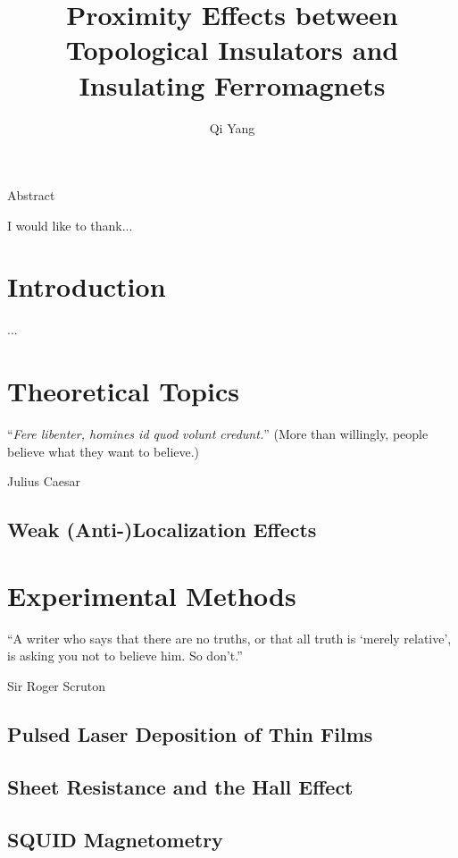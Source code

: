 ﻿\documentclass{report}
\begin{document}
\title{Proximity Effects between Topological Insulators and Insulating Ferromagnets}
\author{Qi Yang}

\beforepreface


    Abstract 


    I would like to thank...
\afterpreface

\captionsetup{width=0.95\columnwidth}%
\chapter{Introduction}\label{ch:intro}
    ...

\chapter{Theoretical Topics}\label{ch:theory}
\begin{refsection} 
\epigraph{``\textit{Fere libenter, homines id quod volunt credunt.}'' (More than willingly, people believe what they want to believe.)}{Julius Caesar}
    \section{Weak (Anti-)Localization Effects}\label{sec:wl}
    
    \printbibliography[heading=subbibintoc, title=References for Chpter~\ref{ch:theory}]
\end{refsection}	
\chapter{Experimental Methods}\label{ch:methods}%
\begin{refsection}   
\epigraph{``A writer who says that there are no truths, or that all truth is `merely relative', is asking you not to believe him. So don't.''}{Sir Roger Scruton}
    \section{Pulsed Laser Deposition of Thin Films}\label{sec:pld}
		
    \section{Sheet Resistance and the Hall Effect}
		
    \section{SQUID Magnetometry}
        
    \printbibliography[heading=subbibintoc, title=References for Chapter~\ref{ch:methods}]
\end{refsection} 
\end{document}
